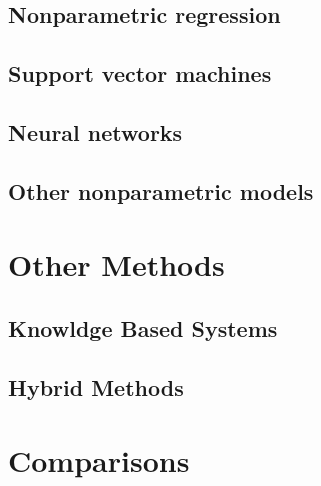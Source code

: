 \subsection{Nonparametric regression}

\subsection{Support vector machines}

\subsection{Neural networks}

\subsection{Other nonparametric models}

\section{Other Methods}

\subsection{Knowldge Based Systems}

\subsection{Hybrid Methods}

\section{Comparisons}
